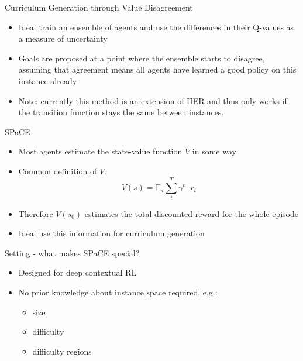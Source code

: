 \documentclass[aspectratio=169]{../latex_main/tntbeamer}  %
\begin{document}
\begin{frame}[c]{Curriculum Generation through Value Disagreement~}
	
	\begin{itemize}
		\item Idea: train an ensemble of agents and use the differences in their Q-values as a measure of uncertainty
		\item Goals are proposed at a point where the ensemble starts to disagree, assuming that agreement means all agents have learned a good policy on this instance already
		\item Note: currently this method is an extension of HER and thus only works if the transition function stays the same between instances. 
	\end{itemize}
	
\end{frame}

\begin{frame}[c]{SPaCE~}
	
	\begin{itemize}
		\item Most agents estimate the state-value function $V$ in some way
		\item Common definition of $V$: 
			$$ V(s) = \mathbb{E}_{\pi} \sum_t^T \gamma^t \cdot r_t $$
		\item Therefore $V(s_0)$ estimates the total discounted reward for the whole episode
		\item Idea: use this information for curriculum generation
	\end{itemize}
	
\end{frame}


\begin{frame}[c]{Setting - what makes SPaCE special?}
	
	\begin{itemize}
		\item Designed for deep contextual RL
		\item No prior knowledge about instance space required, e.g.:
		\begin{itemize}
			\item size
			\item difficulty
			\item difficulty regions
		\end{itemize}
	\end{itemize}
	
\end{frame}
\end{document}
